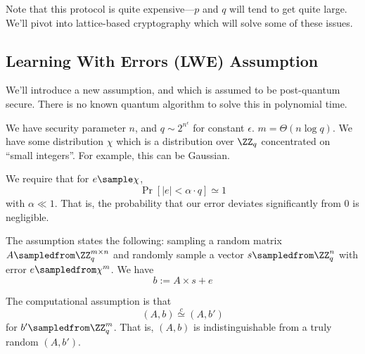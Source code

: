 Note that this protocol is quite expensive---$p$ and $q$ will tend to get quite large. We'll pivot into lattice-based cryptography which will solve some of these issues.

\subsection{Learning With Errors (LWE) Assumption}
We'll introduce a new assumption, and which is assumed to be post-quantum secure. There is no known quantum algorithm to solve this in polynomial time.

We have security parameter $n$, and $q\sim 2^{n^\epsilon}$ for constant $\epsilon$. $m = \Theta(n\log q)$. We have some distribution $\chi$ which is a distribution over $\ZZ_q$ concentrated on ``small integers''. For example, this can be Gaussian.


We require that for $e\sample \chi$, 
\[\Pr[|e| < \alpha\cdot q ]\simeq 1\]
with $\alpha \ll 1$. That is, the probability that our error deviates significantly from $0$ is negligible.

The assumption states the following: sampling a random matrix $A\sampledfrom \ZZ_q^{m\times n}$ and randomly sample a vector $s\sampledfrom \ZZ_q^n$ with error $e\sampledfrom \chi^m$. We have \[b:=A\times s + e\]

The computational assumption is that
\[(A, b)\overset{c}{\simeq} (A, b')\]
for $b'\sampledfrom \ZZ_q^m$. That is, $(A, b)$ is indistinguishable from a truly random $(A, b')$.

